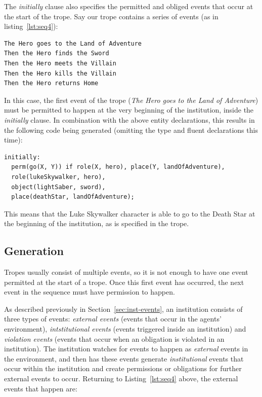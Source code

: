 \documentclass[11pt]{report}
\begin{document}
The \emph{initially} clause also specifies the permitted and obliged events that
occur at the start of the trope. Say our trope contains a series of events (as in
listing~\ref{lst:seq4}):

\begin{lstlisting}
The Hero goes to the Land of Adventure
Then the Hero finds the Sword
Then the Hero meets the Villain
Then the Hero kills the Villain
Then the Hero returns Home
\end{lstlisting}

In this case, the first event of the trope (\emph{The Hero goes to the Land of
  Adventure}) must be permitted to happen at the very beginning of the
institution, inside the \emph{initially} clause. In combination with the above
entity declarations, this results in the following code being generated
(omitting the type and fluent declarations this time):

\begin{lstlisting}
initially:
  perm(go(X, Y)) if role(X, hero), place(Y, landOfAdventure),
  role(lukeSkywalker, hero),
  object(lightSaber, sword),
  place(deathStar, landOfAdventure);
\end{lstlisting}

This means that the Luke Skywalker character is able to go to the Death Star at the beginning
of the institution, as is specified in the trope.

\subsection{Generation}
\label{sec:anat-gen}

Tropes usually consist of multiple events, so it is not enough to have one event
permitted at the start of a trope. Once this first event has occurred, the next
event in the sequence must have permission to happen.

As described previously in Section~\ref{sec:inst-events}, an institution
consists of three types of events: \emph{external events} (events that occur in
the agents' environment), \emph{intstitutional
  events} (events triggered inside an institution) and \emph{violation events}
(events that occur when an obligation is violated in an institution). The institution watches for events to happen as \emph{external} events in the
environment, and then has these events generate \emph{institutional} events that
occur within the institution and create permissions or obligations for further
external events to occur. Returning to Listing~\ref{lst:seq4} above, the
external events that happen are:
\end{document}

